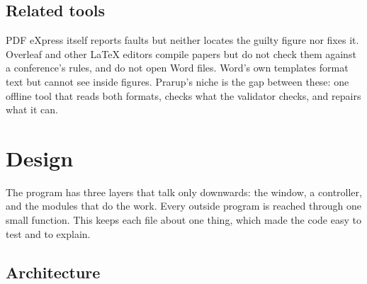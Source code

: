 \documentclass[11pt,a4paper,oneside,openany]{book}
\begin{document}
\section{Related tools}
PDF eXpress itself reports faults but neither locates the guilty figure nor fixes it. Overleaf and other
\LaTeX{} editors compile papers but do not check them against a conference's rules, and do not open Word
files. Word's own templates format text but cannot see inside figures. Prarup's niche is the gap between
these: one offline tool that reads both formats, checks what the validator checks, and repairs what it can.

\chapter{Design}\label{ch:design}

\begin{takeaway}
The program has three layers that talk only downwards: the window, a controller, and the modules that do
the work. Every outside program is reached through one small function. This keeps each file about one
thing, which made the code easy to test and to explain.
\end{takeaway}

\section{Architecture}
\end{document}

